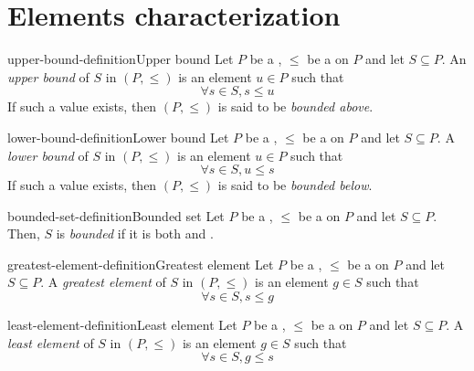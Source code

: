 \documentclass[preview]{standalone}
\begin{document}
\section{Elements characterization}

\begin{snippetdefinition}{upper-bound-definition}{Upper bound}
    Let \(P\) be a \set, \(\leq\) be a \preorder on \(P\) and let \(S\subseteq P\).
    An \textit{upper bound} of \(S\) in \((P, \leq)\) is an element \(u\in P\) such that
    \[ \forall s\in S, s \leq u \]
    If such a value exists, then \((P, \leq)\) is said to be \textit{bounded above}.
\end{snippetdefinition}

\begin{snippetdefinition}{lower-bound-definition}{Lower bound}
    Let \(P\) be a \set, \(\leq\) be a \preorder on \(P\) and let \(S\subseteq P\).
    A \textit{lower bound} of \(S\) in \((P, \leq)\) is an element \(u\in P\) such that
    \[ \forall s\in S, u \leq s \]
    If such a value exists, then \((P, \leq)\) is said to be \textit{bounded below}.
\end{snippetdefinition}

\begin{snippetdefinition}{bounded-set-definition}{Bounded set}
    Let \(P\) be a \set, \(\leq\) be a \preorder on \(P\) and let \(S\subseteq P\).
    Then, \(S\) is \textit{bounded} if it is both  and
    .
\end{snippetdefinition}


\begin{snippetdefinition}{greatest-element-definition}{Greatest element}
    Let \(P\) be a \set, \(\leq\) be a \preorder on \(P\) and let \(S\subseteq P\).
    A \textit{greatest element} of \(S\) in \((P, \leq)\) is an element \(g \in S\) such that
    \[ \forall s\in S, s \leq g \]
\end{snippetdefinition}

\begin{snippetdefinition}{least-element-definition}{Least element}
    Let \(P\) be a \set, \(\leq\) be a \preorder on \(P\) and let \(S\subseteq P\).
    A \textit{least element} of \(S\) in \((P, \leq)\) is an element \(g \in S\) such that
    \[ \forall s\in S, g \leq s \]
\end{snippetdefinition}
\end{document}
